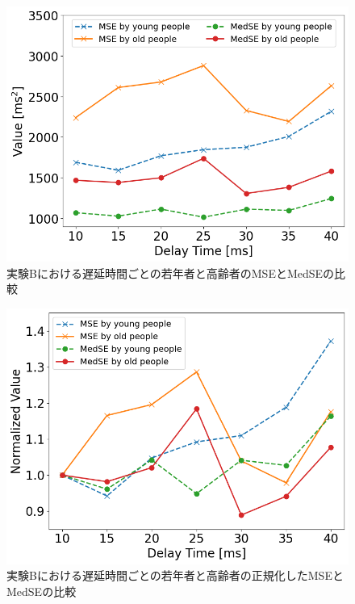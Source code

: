 \begin{figure}[tbp]
  \centering
  \includegraphics[scale=0.5]{figures/Honbann/Comparison_young_old/40ms_MSE-MedSE.png}
  \caption{実験Bにおける遅延時間ごとの若年者と高齢者のMSEとMedSEの比較}
  \label{fig:40ms_MSE_MedSE}
\end{figure}

\begin{figure}[tbp]
  \centering
  \includegraphics[scale=0.5]{figures/Honbann/Comparison_young_old/Normalized_40ms_MSE-MedSE.png}
  \caption{実験Bにおける遅延時間ごとの若年者と高齢者の正規化したMSEとMedSEの比較}
  \label{fig:Normalized_40ms_MSE_MedSE}
\end{figure}